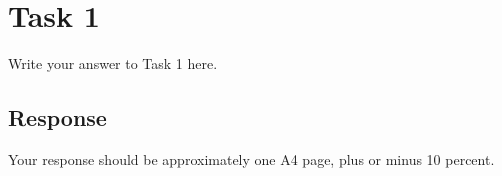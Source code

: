 
\section{Task 1}

Write your answer to Task 1 here.

\subsection{Response}

Your response should be approximately one A4 page, plus or minus 10 percent.